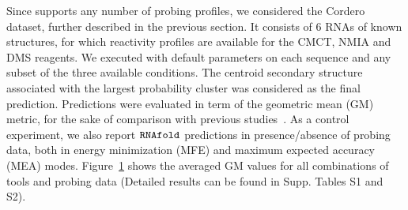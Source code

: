 \documentclass[a4,center,fleqn]{NAR}
\begin{document}
Since \OurTool{} supports any number of probing profiles, we considered the Cordero\etal\cite{Cordero2012a} dataset, further described in the previous section. It consists of 6 RNAs of known structures, for which reactivity profiles are available for the CMCT, NMIA and DMS reagents. We executed \OurTool{} with default parameters on each sequence and any subset of the three available conditions. The centroid secondary structure  associated with the largest probability cluster was considered as the final prediction. Predictions were evaluated in term of the geometric mean (GM) metric, for the sake of comparison with previous studies~\cite{Spasic2017}. As a control experiment, we also report ${\tt RNAfold}$ predictions in presence/absence of probing data, both in energy minimization (MFE) and maximum expected accuracy (MEA) modes. Figure~\ref{cordero1} shows the averaged GM values for all combinations of tools and probing data (Detailed results can be found in Supp. Tables S1 and S2).



\begin{figure}
	{\\}
	
	\caption{}
	\label{cordero1}
\end{figure}
\end{document}
